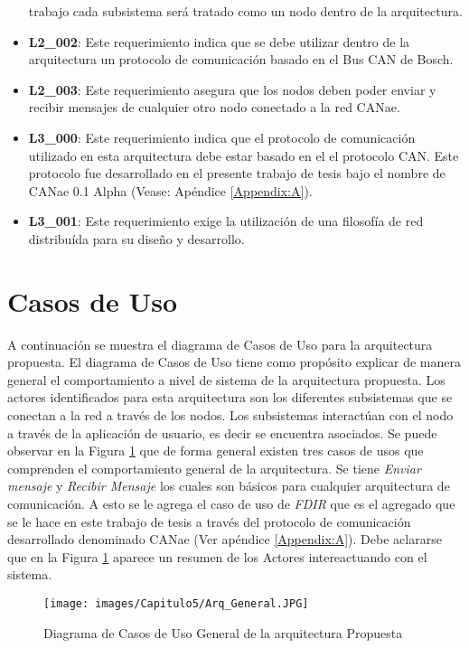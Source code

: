 \begin{itemize}
  trabajo cada subsistema será tratado como un nodo dentro de la arquitectura.
\item\textbf{L2\_002}: Este requerimiento indica que se debe utilizar dentro de
  la arquitectura un protocolo de comunicación basado en el Bus CAN de Bosch.
\item\textbf{L2\_003}: Este requerimiento asegura que los nodos deben poder enviar
  y recibir mensajes de cualquier otro nodo conectado a la red CANae.
\item\textbf{L3\_000}: Este requerimiento indica que el protocolo de
  comunicación utilizado en esta arquitectura debe estar basado en el
  el protocolo CAN. Este protocolo fue desarrollado en el presente
  trabajo de tesis bajo el nombre de CANae 0.1 Alpha (Vease: Apéndice \ref{Appendix:A}).
\item\textbf{L3\_001}: Este requerimiento exige la utilización de una
  filosofía de red distribuída para su diseño y desarrollo.
\end{itemize}

\section{Casos de Uso}\label{sec:caso_uso}
A continuación se muestra el diagrama de Casos de Uso para la arquitectura propuesta.
El diagrama de Casos de Uso tiene como propósito explicar de manera general
el comportamiento a nivel de sistema de la arquitectura propuesta.
Los actores identificados para esta arquitectura son los diferentes
subsistemas que se conectan a la red a través de los nodos.
Los subsistemas interactúan con el nodo a través de
la aplicación de usuario, es decir se encuentra asociados.
Se puede observar en la Figura \ref{fig:DiagramaCUArqPropuestaGENERAL}
que de forma general existen tres casos de usos que comprenden el comportamiento
general de la arquitectura. Se tiene \textit{Enviar mensaje} y \textit{Recibir
  Mensaje} los cuales son básicos para cualquier arquitectura de comunicación. A
esto se le agrega el caso de uso de \textit{FDIR} que es el agregado que se le
hace en este trabajo de tesis a través del protocolo de comunicación desarrollado
denominado CANae (Ver apéndice \ref{Appendix:A}). Debe aclararse que en 
la Figura \ref{fig:DiagramaCUArqPropuestaGENERAL}
aparece un resumen de los Actores intereactuando con el sistema. 

\begin{figure}[h!]
 \centering
 \texttt{[image: images/Capitulo5/Arq\_General.JPG]}
  \caption{Diagrama de Casos de Uso General de la arquitectura Propuesta}
\label{fig:DiagramaCUArqPropuestaGENERAL}
\end{figure} 

